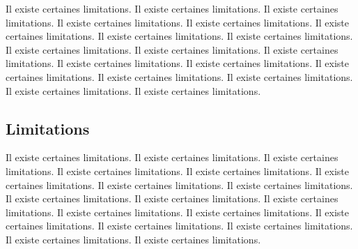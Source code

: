 \documentclass[11pt,a4paper,oneside]{report}
\begin{document}
Il existe certaines limitations.
Il existe certaines limitations.
Il existe certaines limitations.
Il existe certaines limitations.
Il existe certaines limitations.
Il existe certaines limitations.
Il existe certaines limitations.
Il existe certaines limitations.
Il existe certaines limitations.
Il existe certaines limitations.
Il existe certaines limitations.
Il existe certaines limitations.
Il existe certaines limitations.
Il existe certaines limitations.
Il existe certaines limitations.
Il existe certaines limitations.
Il existe certaines limitations.
Il existe certaines limitations.
\subsection{Limitations}

Il existe certaines limitations.
Il existe certaines limitations.
Il existe certaines limitations.
Il existe certaines limitations.
Il existe certaines limitations.
Il existe certaines limitations.
Il existe certaines limitations.
Il existe certaines limitations.
Il existe certaines limitations.
Il existe certaines limitations.
Il existe certaines limitations.
Il existe certaines limitations.
Il existe certaines limitations.
Il existe certaines limitations.
Il existe certaines limitations.
Il existe certaines limitations.
Il existe certaines limitations.
Il existe certaines limitations.
\end{document}
